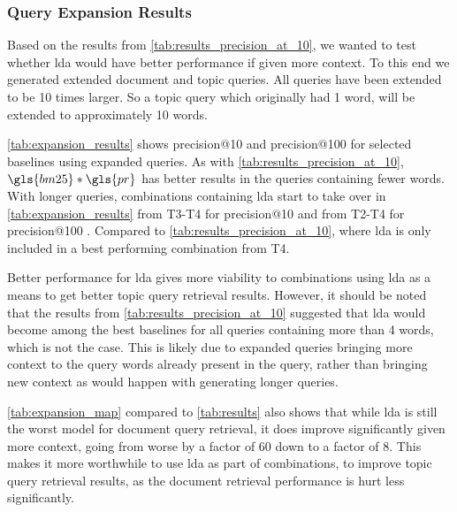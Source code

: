 \subsubsection{Query Expansion Results}

Based on the results from \autoref{tab:results_precision_at_10}, we wanted to test whether \gls{lda} would have better performance if given more context.
To this end we generated extended document and topic queries.
All queries have been extended to be 10 times larger. 
So a topic query which originally had 1 word, will be extended to approximately 10 words.

\autoref{tab:expansion_results} shows precision@10 and precision@100 for selected baselines using expanded queries.
As with \autoref{tab:results_precision_at_10}, $\gls{bm25} * \gls{pr}$ has better results in the queries containing fewer words.
With longer queries, combinations containing \gls{lda} start to take over in \autoref{tab:expansion_results} from T3-T4 for precision@10 and from T2-T4 for precision@100 .
Compared to \autoref{tab:results_precision_at_10}, where \gls{lda} is only included in a best performing combination from T4.

Better performance for \gls{lda} gives more viability to combinations using \gls{lda} as a means to get better topic query retrieval results.
However, it should be noted that the results from \autoref{tab:results_precision_at_10} suggested that \gls{lda} would become among the best baselines for all queries containing more than 4 words, which is not the case.
This is likely due to expanded queries bringing more context to the query words already present in the query, rather than bringing new context as would happen with generating longer queries.

\autoref{tab:expansion_map} compared to \autoref{tab:results} also shows that while \gls{lda} is still the worst model for document query retrieval, it does improve significantly given more context, going from worse by a factor of 60 down to a factor of 8.
This makes it more worthwhile to use \gls{lda} as part of combinations, to improve topic query retrieval results, as the document retrieval performance is hurt less significantly.  

